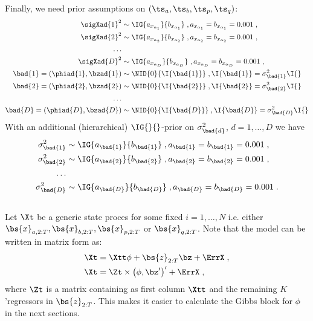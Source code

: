 Finally, we need prior assumptions on $\left(\ts_a,\ts_b,\ts_p,\ts_q\right)$:
\begin{align*}
\sigXad{1}^2 &\sim \IG{a_{x_{\alpha_1}}}{b_{x_{\alpha_1}}}\;,a_{x_{\alpha_1}}=b_{x_{\alpha_1}}=0.001\;,\\
\sigXad{2}^2 &\sim \IG{a_{x_{\alpha_2}}}{b_{x_{\alpha_2}}}\;,a_{x_{\alpha_2}}=b_{x_{\alpha_2}}=0.001\;,\\
\ldots&\\
\sigXad{D}^2 &\sim \IG{a_{x_{\alpha_D}}}{b_{x_{\alpha_D}}}\;,a_{x_{\alpha_D}}=b_{x_{\alpha_D}}=0.001\;,\\
\bad{1}=\left(\phiad{1},\bzad{1}\right) &\sim \NID{0}{\I{\bad{1}}}\;,\I{\bad{1}}=\sigma_{\bad{1}}^2\I{}\\
\bad{2}=\left(\phiad{2},\bzad{2}\right) &\sim \NID{0}{\I{\bad{2}}}\;,\I{\bad{2}}=\sigma_{\bad{2}}^2\I{}\\
\ldots & \\
\bad{D}=\left(\phiad{D},\bzad{D}\right) &\sim \NID{0}{\I{\bad{D}}}\;,\I{\bad{D}}=\sigma_{\bad{D}}^2\I{}
\end{align*}
With an additional (hierarchical) $\IG{}{}$-prior on $\sigma_{\bad{d}}^2$, $d=1,\ldots,D$ we have
\begin{align*}
\sigma_{\bad{1}}^2 &\sim \IG{a_{\bad{1}}}{b_{\bad{1}}}\;,a_{\bad{1}}=b_{\bad{1}}=0.001\;,\\
\sigma_{\bad{2}}^2 &\sim \IG{a_{\bad{2}}}{b_{\bad{2}}}\;,a_{\bad{2}}=b_{\bad{2}}=0.001\;,\\
\ldots & \\
\sigma_{\bad{D}}^2 &\sim \IG{a_{\bad{D}}}{b_{\bad{D}}}\;,a_{\bad{D}}=b_{\bad{D}}=0.001\;.\\
\end{align*}
\\
Let $\Xt$ be a generic state proces for some fixed $i=1,\ldots,N$ i.e. either $\bs{x}_{a,2:T},\bs{x}_{b,2:T},\bs{x}_{p,2:T}$ or $\bs{x}_{q,2:T}$. Note that the model can be written in matrix form as:
\begin{align*}
\Xt&=\Xtt\phi + \bs{z}_{2:T}\bz + \ErrX\;,\\
\Xt&=\Zt\times \left(\phi,\bz^{\prime}\right)^{\prime} + \ErrX\;,
\end{align*}
where $\Zt$ is a matrix containing as first column $\Xtt$ and the remaining $K$'regressors in $\bs{z}_{2:T}$.
This makes it easier to calculate the Gibbs block for $\phi$ in the next sections.
%
%
%
%
%
\clearpage

